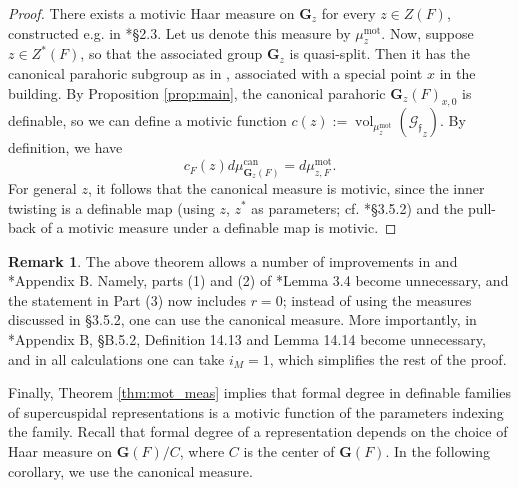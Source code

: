 \documentclass{amsart}
\newcommand{\cG}{\mathcal{G}}
\DeclareMathOperator{\vol}{vol}
\newcommand{\bG}{\mathbf{G}}
\newcommand{\can}{\mathrm{can}}
\newcommand{\ff}{{\mathfrak f}}
\newcommand\mot{\mathrm{mot}}
\theoremstyle{plain}
\theoremstyle{definition}
\newtheorem{rem}[thm]{Remark}
\begin{document}
\begin{proof} There exists a motivic Haar measure on $\bG_z$ for every $z\in Z(F)$,
constructed e.g. in \cite{gordon-hales:15a}*{\S 2.3}. Let us denote this measure by $\mu_z^\mot$. Now, suppose 
$z\in Z^\ast(F)$, so that the associated group $\bG_z$ is quasi-split.  
Then it has the canonical parahoric subgroup as in \cite{gross:97a}, associated with a special point $x$ in the building. 
By Proposition \ref{prop:main}, the canonical parahoric $\bG_z(F)_{x, 0}$ is definable, so we can define  a motivic function $c(z):=\vol_{\mu_z^\mot}({\cG_{\ff}}_z)$. 
By definition, we have 
\[
c_F(z) d\mu_{\bG_z(F)}^\can = d\mu_{z, F}^\mot.
\]
For general $z$, it follows that the canonical measure is motivic, since the inner twisting is a definable map
(using $z$, $z^\ast$ as parameters; cf. \cite{cluckers-gordon-halupczok:14b}*{\S 3.5.2}) and the pull-back of a motivic measure under a definable map is motivic.
\end{proof}

\begin{rem} The above theorem allows a number of improvements in \cite{cluckers-gordon-halupczok:14b} and 
\cite{shin-templier:15a}*{Appendix B}. 
Namely,  parts (1) and (2) of \cite{cluckers-gordon-halupczok:14b}*{Lemma 3.4} become unnecessary, and the statement in Part (3)
now includes $r=0$; instead of using the measures discussed in \S 3.5.2, one can use the canonical measure. 
More importantly, in \cite{shin-templier:15a}*{Appendix B, \S B.5.2}, Definition 14.13 and Lemma 14.14
become unnecessary, and in all calculations one can take $i_M=1$, which simplifies the rest of the proof.
\end{rem}




Finally, Theorem \ref{thm:mot_meas} implies that formal degree in definable families of
supercuspidal representations is a motivic function of the parameters indexing the family. 
Recall that formal degree of a representation depends on the choice of Haar measure on 
$\bG(F)/C$, where $C$ is the center of $\bG(F)$. 
In the following corollary, we use the canonical measure. 
 
\end{document}
